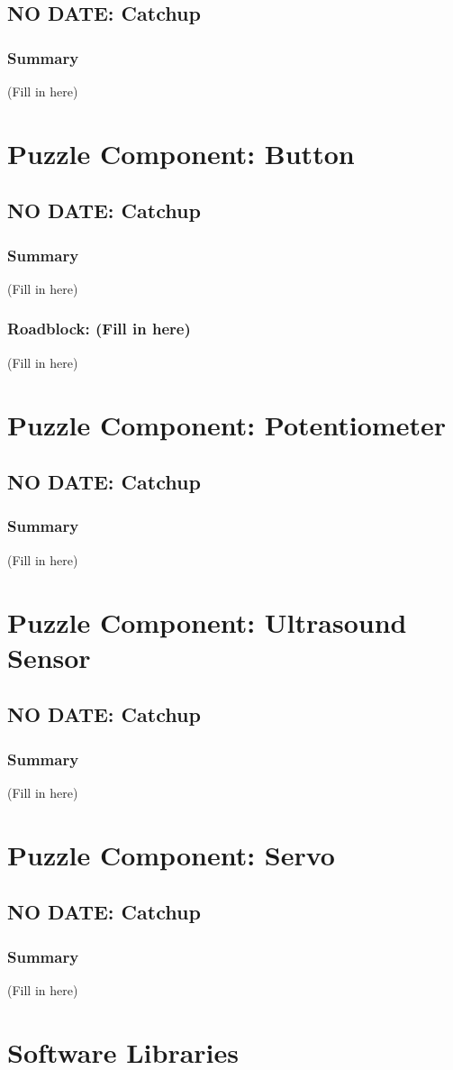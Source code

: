 \documentclass[a4paper, 10pt]{article}
\begin{document}
	\subsection{NO DATE: Catchup}
		\subsubsection{Summary}
		(Fill in here)

\section{Puzzle Component: Button}
	\subsection{NO DATE: Catchup}
		\subsubsection{Summary}
		(Fill in here)
		
		\subsubsection{Roadblock: (Fill in here)}
		(Fill in here)

\section{Puzzle Component: Potentiometer}
	\subsection{NO DATE: Catchup}
		\subsubsection{Summary}
		(Fill in here)
		
\section{Puzzle Component: Ultrasound Sensor}
	\subsection{NO DATE: Catchup}
		\subsubsection{Summary}
		(Fill in here)

\section{Puzzle Component: Servo}
	\subsection{NO DATE: Catchup}
		\subsubsection{Summary}
		(Fill in here)
		 
\section{Software Libraries}
		
\end{document}
